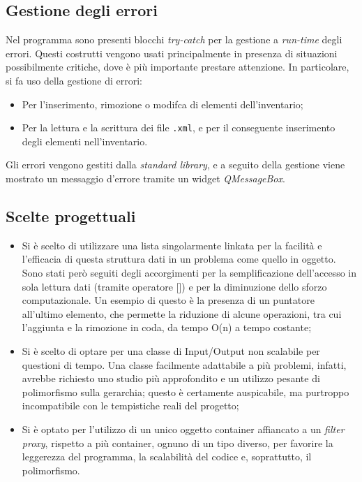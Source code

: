 \subsection{Gestione degli errori}
Nel programma sono presenti blocchi \textit{try-catch} per la gestione a \textit{run-time} degli errori. Questi costrutti vengono usati principalmente in presenza di situazioni possibilmente critiche, dove è più importante prestare attenzione. In particolare, si fa uso della gestione di errori:
\begin{itemize}
  \item Per l'inserimento, rimozione o modifca di elementi dell'inventario;
  \item Per la lettura e la scrittura dei file \texttt{.xml}, e per il conseguente inserimento degli elementi nell'inventario.
\end{itemize}
Gli errori vengono gestiti dalla \textit{standard library}, e a seguito della gestione viene mostrato un messaggio d'errore tramite un widget \textit{QMessageBox}.


\subsection{Scelte progettuali}
\begin{itemize}
\item Si è scelto di utilizzare una lista singolarmente linkata per la facilità e l'efficacia di questa struttura dati in un problema come quello in oggetto. Sono stati però seguiti degli accorgimenti per la semplificazione dell'accesso in sola lettura dati (tramite operatore []) e per la diminuzione dello sforzo computazionale. Un esempio di questo è la presenza di un puntatore all'ultimo elemento, che permette la riduzione di alcune operazioni, tra cui l'aggiunta e la rimozione in coda, da tempo O(n) a tempo costante;
\item Si è scelto di optare per una classe di Input/Output non scalabile per questioni di tempo. Una classe facilmente adattabile a più problemi, infatti, avrebbe richiesto uno studio più approfondito e un utilizzo pesante di polimorfismo sulla gerarchia; questo è certamente auspicabile, ma purtroppo incompatibile con le tempistiche reali del progetto;
\item Si è optato per l'utilizzo di un unico oggetto container affiancato a un \textit{filter proxy}, rispetto a più container, ognuno di un tipo diverso, per favorire la leggerezza del programma, la scalabilità del codice e, soprattutto, il polimorfismo.
\end{itemize}
